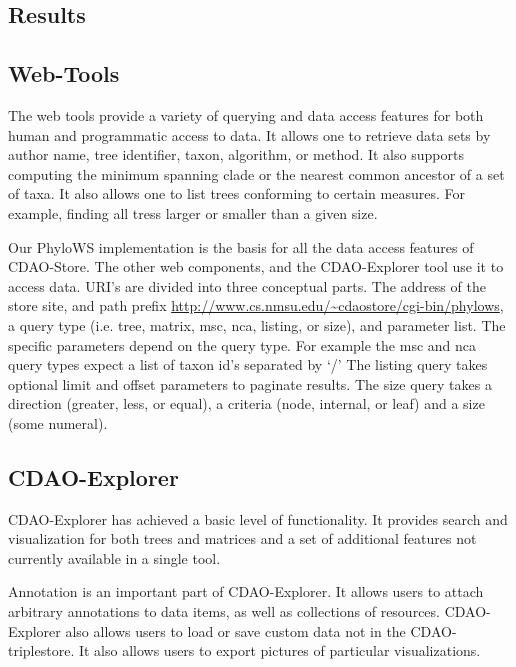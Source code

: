 \documentclass[10pt]{bmc_article}
\newenvironment{bmcformat}{\begin{raggedright}\baselineskip20pt\sloppy\setboolean{publ}{false}}{\end{raggedright}\baselineskip20pt\sloppy}
\begin{document}
\begin{bmcformat}
\section*{Results}
  \subsection*{Web-Tools}
  The web tools provide a variety of querying and data access features for both
human and programmatic access to data. It allows one to retrieve data sets by
author name, tree identifier, taxon, algorithm, or method. It also supports
computing the minimum spanning clade or the nearest common ancestor of a set of
taxa. It also allows one to  list trees conforming to certain measures. For
example, finding all tress larger or smaller than a given size. 

   Our PhyloWS implementation is the basis for all the data access features of
CDAO-Store. The other web components, and the CDAO-Explorer tool use it to
access data. URI's are divided into three conceptual parts. The address of the
store site, and path prefix
\url{http://www.cs.nmsu.edu/~cdaostore/cgi-bin/phylows}, a query type (i.e.
tree, matrix, msc, nca, listing, or size), and parameter list. The specific
parameters depend on the query type. For example the msc and nca query types
expect a list of taxon id's separated by `/' The listing query takes optional
limit and offset parameters to paginate results. The size query takes a
direction (greater, less, or equal),  a criteria (node, internal, or leaf) and
a size (some numeral).

  
  \subsection*{CDAO-Explorer}
  CDAO-Explorer has achieved a basic level of functionality. It provides search
and visualization for both trees and matrices and a set of additional features
not currently available in a single tool. 
  
  Annotation is an important part of CDAO-Explorer. It allows users to attach
arbitrary annotations to data items, as well as collections of resources.
CDAO-Explorer also allows users to load or save custom data not in the
CDAO-triplestore. It also allows users to export pictures of particular
visualizations. 


\end{bmcformat}
\end{document}
